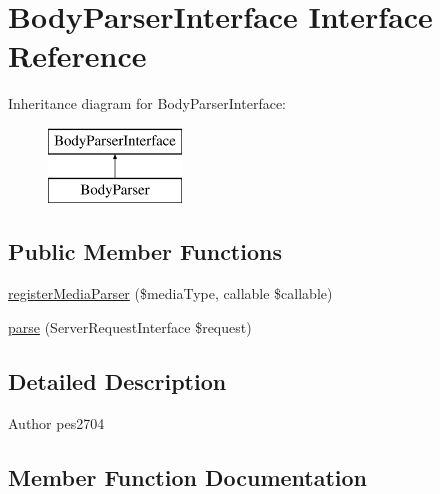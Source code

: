 \hypertarget{interface_pes_1_1_http_1_1_body_1_1_body_parser_interface}{}\section{Body\+Parser\+Interface Interface Reference}
\label{interface_pes_1_1_http_1_1_body_1_1_body_parser_interface}
Inheritance diagram for Body\+Parser\+Interface\+:\begin{figure}[H]
\begin{center}
\leavevmode
\includegraphics[height=2.000000cm]{interface_pes_1_1_http_1_1_body_1_1_body_parser_interface}
\end{center}
\end{figure}
\subsection*{Public Member Functions}
\begin{DoxyCompactItemize}
\item 
\mbox{\hyperlink{interface_pes_1_1_http_1_1_body_1_1_body_parser_interface_a25bb60104b8414e955c9462104e44743}{register\+Media\+Parser}} (\$media\+Type, callable \$callable)
\item 
\mbox{\hyperlink{interface_pes_1_1_http_1_1_body_1_1_body_parser_interface_a60ebb3c19a4dbeebbab0a5c5c7882d53}{parse}} (Server\+Request\+Interface \$request)
\end{DoxyCompactItemize}


\subsection{Detailed Description}
\begin{DoxyAuthor}{Author}
pes2704 
\end{DoxyAuthor}


\subsection{Member Function Documentation}
\mbox{\label{interface_pes_1_1_http_1_1_body_1_1_body_parser_interface_a60ebb3c19a4dbeebbab0a5c5c7882d53}} 
